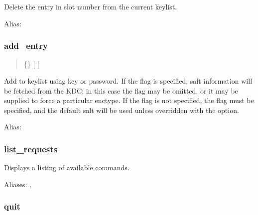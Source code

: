 \documentclass[letterpaper,10pt,english]{sphinxmanual}
\begin{document}
Delete the entry in slot number  from the current keylist.

Alias: 


\subsubsection{add\_entry}
\label{\detokenize{admin/admin_commands/ktutil:add-entry}}\begin{quote}

 \{\textbar{}\}  
  {[} \sphinxstyleemphasis{enctype}{]} {[}\textbar{} \sphinxstyleemphasis{salt}{]}
\end{quote}

Add  to keylist using key or password.  If the  flag
is specified, salt information will be fetched from the KDC; in this
case the  flag may be omitted, or it may be supplied to force a
particular enctype.  If the  flag is not specified, the 
flag must be specified, and the default salt will be used unless
overridden with the  option.

Alias: 


\subsubsection{list\_requests}
\label{\detokenize{admin/admin_commands/ktutil:list-requests}}\begin{quote}

\end{quote}

Displays a listing of available commands.

Aliases: , 


\subsubsection{quit}
\label{\detokenize{admin/admin_commands/ktutil:quit}}\begin{quote}

\end{quote}
\end{document}
